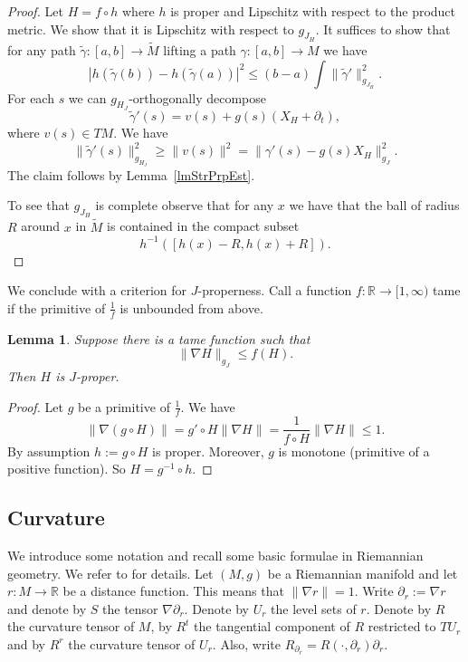 \documentclass[11pt]{amsart}
\newcommand{\R}{\mathbb{R}}
\newtheorem{lm}[tm]{Lemma}
\theoremstyle{definition}
\theoremstyle{remark}
\begin{document}
\begin{proof}
Let $H=f\circ h$ where $h$ is proper and Lipschitz with respect to the product metric. We show that it is Lipschitz with respect to $g_{J_H}$. It suffices to show that for any path $\tilde{\gamma}:[a,b]\to\tilde{M}$ lifting a path $\gamma:[a,b]\to M$ we have
\[
|h(\tilde{\gamma}(b))-h(\tilde{\gamma}(a))|^2 \leq (b-a)\int\|\tilde{\gamma}'\|^2_{g_{J_H}}.
\]
For each $s$ we can $g_{H_J}$-orthogonally decompose
\[
\tilde{\gamma}'(s)=v(s)+g(s)(X_H+\partial_t),
\]
where $v(s)\in TM$. We have
\[
\|\tilde{\gamma}'(s)\|^2_{g_{H_J}}\geq\|v(s)\|^2=\|\gamma'(s)-g(s)X_H\|^2_{g_J}.
\]
The claim follows by Lemma~\ref{lmStrPrpEst}.

To see that $g_{J_H}$ is complete observe that  for any $x$ we have that the ball of radius $R$ around $x$ in $\tilde{M}$ is contained in the compact subset
\[
h^{-1}([h(x)-R,h(x)+R]).
\]

\end{proof}
We conclude with a criterion for $J$-properness. Call a function $f:\R\to[1,\infty)$ tame if the primitive of $\frac1{f}$ is unbounded from above.
\begin{lm}\label{lmCompCrit}
Suppose there is a tame function such that
\[
\|\nabla H\|_{g_J}\leq f(H).
\]
Then $H$ is $J$-proper.
\end{lm}
\begin{proof}
Let $g$ be a primitive of $\frac1{f}$. We have
\[
\|\nabla (g\circ H)\|=g'\circ H\|\nabla H\|=\frac1{f\circ H}\|\nabla H\|\leq 1.
\]
By assumption $h:=g\circ H$ is proper. Moreover, $g$ is monotone (primitive of a positive function). So $H=g^{-1}\circ h$.
\end{proof}

\subsection{Curvature}We introduce some notation and recall some basic formulae in Riemannian geometry. We refer to \cite{pe} for details. Let $(M,g)$ be a Riemannian manifold and let $r:M\to\R$ be a distance function. This means that $\|\nabla r\|=1$. Write $\partial_r:=\nabla r$ and denote by $S$ the tensor $\nabla\partial_r$. Denote by $U_r$ the level sets of $r$. Denote by $R$ the curvature tensor of $M$, by $R^t$ the tangential component of $R$ restricted to $TU_r$ and by $R^r$ the curvature tensor of $U_r$. Also, write $R_{\partial_r}=R(\cdot,\partial_r)\partial_r.$
\end{document}
